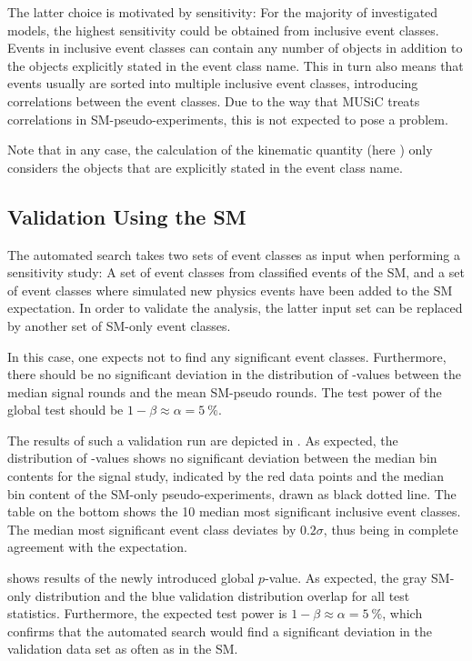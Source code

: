The latter choice is motivated by sensitivity: For the majority of investigated models, the highest sensitivity could be obtained from inclusive event classes. Events in inclusive event classes can contain any number of objects in addition to the objects explicitly stated in the event class name. This in turn also means that events usually are sorted into multiple inclusive event classes, introducing correlations between the event classes. Due to the way that \ac{MUSiC} treats correlations in \ac{SM}-pseudo-experiments, this is not expected to pose a problem.

Note that in any case, the calculation of the kinematic quantity (here \sumpT) only considers the objects that are explicitly stated in the event class name.

\subsection{Validation Using the \ac{SM}}
The automated search takes two sets of event classes as input when performing a sensitivity study: A set of event classes from classified events of the \acl{SM}, and a set of event classes where simulated new physics events have been added to the \acl{SM} expectation. In order to validate the analysis, the latter input set can be replaced by another set of \ac{SM}-only event classes.

In this case, one expects not to find any significant event classes. Furthermore, there should be no significant deviation in the distribution of \ptilde-values between the median signal rounds and the mean \ac{SM}-pseudo rounds. The test power of the global test should be $1 - \beta \approx \alpha = \SI{5}{\percent}$.

The results of such a validation run are depicted in . As expected, the distribution of \ptilde-values shows no significant deviation between the median bin contents for the signal study, indicated by the red data points and the median bin content of the \ac{SM}-only pseudo-experiments, drawn as black dotted line. The table on the bottom shows the \num{10} median most significant inclusive event classes. The median most significant event class deviates by $\num{0.2}\sigma$, thus being in complete agreement with the expectation. 

 shows results of the newly introduced global $p$-value. As expected, the gray \ac{SM}-only distribution and the blue validation distribution overlap for all test statistics. Furthermore, the expected test power is $1 - \beta \approx \alpha = \SI{5}{\percent}$, which confirms that the automated search would find a significant deviation in the validation data set as often as in the \ac{SM}.

